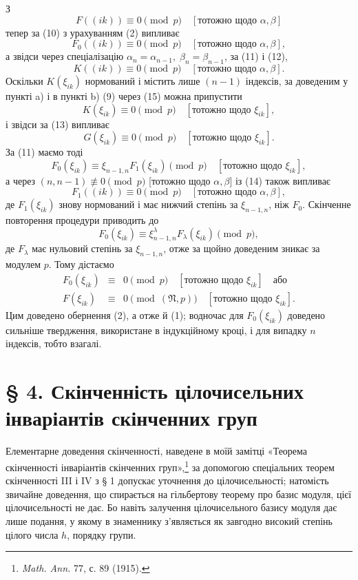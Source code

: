 \documentclass[11pt]{article}
\providecommand{\frN}{\mathfrak N}
\begin{document}
З
\[
        F((ik))\equiv0\pmod p\quad [\text{тотожно щодо \(\alpha,\beta\)}]
\]
тепер за (10) з урахуванням (2) випливає
\begin{equation}
        F_0((ik))\equiv0\pmod p\quad [\text{тотожно щодо \(\alpha,\beta\)}],
\end{equation}
а звідси через спеціалізацію \(\alpha_n=\alpha_{n-1},\;\beta_n=\beta_{n-1}\), за (11) і (12),
\begin{equation}
        K((ik))\equiv0\pmod p\quad [\text{тотожно щодо \(\alpha,\beta\)}].
\end{equation}
Оскільки \(K(\xi_{ik})\) нормований і містить лише \((n-1)\) індексів, за доведеним у пункті a) і в пункті b) (9) через (15) можна припустити
\[
        K(\xi_{ik})\equiv0\pmod p\quad [\text{тотожно щодо \(\xi_{ik}\)}],
\]
і звідси за (13) випливає
\[
        G(\xi_{ik})\equiv0\pmod p\quad [\text{тотожно щодо \(\xi_{ik}\)}].
\]
За (11) маємо тоді
\[
        F_0(\xi_{ik})\equiv\xi_{n-1,n}F_1(\xi_{ik})\pmod p\quad [\text{тотожно щодо \(\xi_{ik}\)}],
\]
а через \((n,n-1)\not\equiv0\pmod p\) [тотожно щодо \(\alpha,\beta\)] із (14) також випливає
\[
        F_1((ik))\equiv0\pmod p\quad [\text{тотожно щодо \(\alpha,\beta\)}],
\]
де \(F_1(\xi_{ik})\) знову нормований і має нижчий степінь за \(\xi_{n-1,n}\), ніж \(F_0\). Скінченне повторення процедури приводить до
\[
        F_0(\xi_{ik})\equiv\xi_{n-1,n}^{\lambda}F_\lambda(\xi_{ik})\pmod p,
\]
де \(F_\lambda\) має нульовий степінь за \(\xi_{n-1,n}\), отже за щойно доведеним зникає за модулем \(p\). Тому дістаємо
\begin{equation}
\begin{array}{rcl}
        F_0(\xi_{ik})&\equiv&0\pmod p\quad [\text{тотожно щодо \(\xi_{ik}\)}]\quad \text{або}\\
        F(\xi_{ik})&\equiv&0\pmod{(\frN,p)}\quad [\text{тотожно щодо \(\xi_{ik}\)}].
\end{array}
\end{equation}
Цим доведено обернення (2), а отже й (1); водночас для \(F_0(\xi_{ik})\) доведено сильніше твердження, використане в індукційному кроці, і для випадку \(n\) індексів, тобто взагалі.

\setcounter{equation}{0}
\section*{§ 4. Скінченність цілочисельних інваріантів скінченних груп}

Елементарне доведення скінченності, наведене в моїй замітці «Теорема скінченності інваріантів скінченних груп»,\footnote{\emph{Math. Ann.} 77, с. 89 (1915).} за допомогою спеціальних теорем скінченності III і IV з § 1 допускає уточнення до цілочисельності; натомість звичайне доведення, що спирається на гільбертову теорему про базис модуля, цієї цілочисельності не дає. Бо навіть залучення цілочисельного базису модуля дає лише подання, у якому в знаменнику з'являється як завгодно високий степінь цілого числа \(h\), порядку групи.
\end{document}
